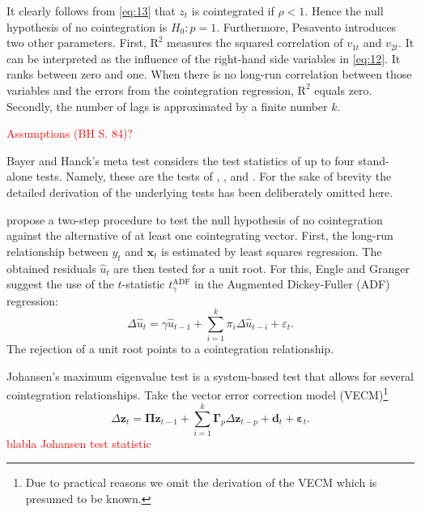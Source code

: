 \documentclass[12pt,a4paper]{article}
\let\rmarkdownfootnote\footnote%
\def\footnote{\protect\rmarkdownfootnote}
\begin{document}
It clearly follows from \eqref{eq:13} that \(z_t\) is cointegrated if
\(\rho < 1\). Hence the null hypothesis of no cointegration is
\(H_0: p = 1\). Furthermore, Pesavento introduces two other parameters.
First, \(\text{R}^2\) measures the squared correlation of \(v_{1t}\) and
\(v_{2t}\). It can be interpreted as the influence of the right-hand
side variables in \eqref{eq:12}. It ranks between zero and one. When
there is no long-run correlation between those variables and the errors
from the cointegration regression, \(\text{R}^2\) equals zero. Secondly,
the number of lags is approximated by a finite number \(k\).

\textcolor{red}{Assumptions (BH S. 84)?}

Bayer and Hanck's \autocite*{Bayerhanck_2012} meta test considers the
test statistics of up to four stand-alone tests. Namely, these are the
tests of \textcite{Englegranger_1987}, \textcite{Johansen_1988},
\textcite{Boswijk_1994} and \textcite{Banerjee_1998}. For the sake of
brevity the detailed derivation of the underlying tests has been
deliberately omitted here.

\textcite{Englegranger_1987} propose a two-step procedure to test the
null hypothesis of no cointegration against the alternative of at least
one cointegrating vector. First, the long-run relationship between
\(y_t\) and \(\mathbf{x}_t\) is estimated by least squares regression.
The obtained residuals \(\hat{u}_t\) are then tested for a unit root.
For this, Engle and Granger suggest the use of the \(t\)-statistic
\(t^{\text{ADF}}_\gamma\) in the Augmented Dickey-Fuller (ADF)
regression: \begin{equation}
\Delta \hat{u}_t = \gamma \hat{u}_{t-1} + \sum^{k}_{i=1} \pi_i \Delta \hat{u}_{t-i} + \varepsilon_t.
\label{eq:2}
\end{equation} The rejection of a unit root points to a cointegration
relationship.

Johansen's \autocite*{Johansen_1988} maximum eigenvalue test is a
system-based test that allows for several cointegration relationships.
Take the vector error correction model (VECM)\footnote{Due to practical
  reasons we omit the derivation of the VECM which is presumed to be
  known.} \begin{equation}
\Delta \mathbf{z}_t = \mathbf{\Pi z}_{t-1} + \sum^{k}_{i = 1} \mathbf{\Gamma}_p \Delta \mathbf{z}_{t-p} + \mathbf{d}_t + \mathbf{\varepsilon}_t.
\label{eq:3}
\end{equation} \textcolor{red}{blabla Johansen test statistic}
\end{document}
